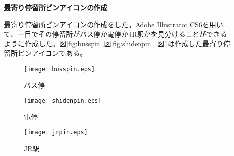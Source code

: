﻿\begin{description}
 \item[] \textbf{最寄り停留所ピンアイコンの作成}\par
 最寄り停留所ピンアイコンの作成をした。Adobe Illustrator CS6を用いて、一目でその停留所がバス停か電停かJR駅かを見分けることができるように作成した。図\ref{fig:busspin},図\ref{fig:shidenpin}, 図\ref{fig:jrpin}は作成した最寄り停留所ピンアイコンである。
  \par
\begin{figure}[htbp]
 \begin{minipage}{0.3\hsize}
  \begin{center}
   \texttt{[image: busspin.eps]}
  \end{center}
  \caption{バス停}
  \label{fig:busspin}
 \end{minipage}
\begin{minipage}{0.3\hsize}
  \begin{center}
   \texttt{[image: shidenpin.eps]}
  \end{center}
  \caption{電停}
  \label{fig:shidenpin}
 \end{minipage}
\begin{minipage}{0.3\hsize}
  \begin{center}
   \texttt{[image: jrpin.eps]}
  \end{center}
  \caption{JR駅}
  \label{fig:jrpin}
 \end{minipage}
\end{figure}
\end{description}
